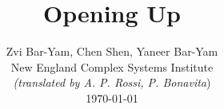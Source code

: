 \documentclass[onecolumn,journal]{IEEEtran}
\begin{document}
\title{\color{Brown} Opening Up \\
\vspace{-0.35ex}}
\author{\large Zvi Bar-Yam, Chen Shen, Yaneer Bar-Yam \\ New England Complex Systems Institute \\
\vspace{+0.35ex}
\small{\textit{(translated by A. P. Rossi, P. Bonavita})}\\
\today 
  \vspace{-10ex} \\ 

   
\bigskip
\bigskip

\textbf{}
 }
    
\maketitle


\flushbottom %



\thispagestyle{empty} %




\renewcommand{\thefootnote}{\fnsymbol{footnote}}
\end{document}
